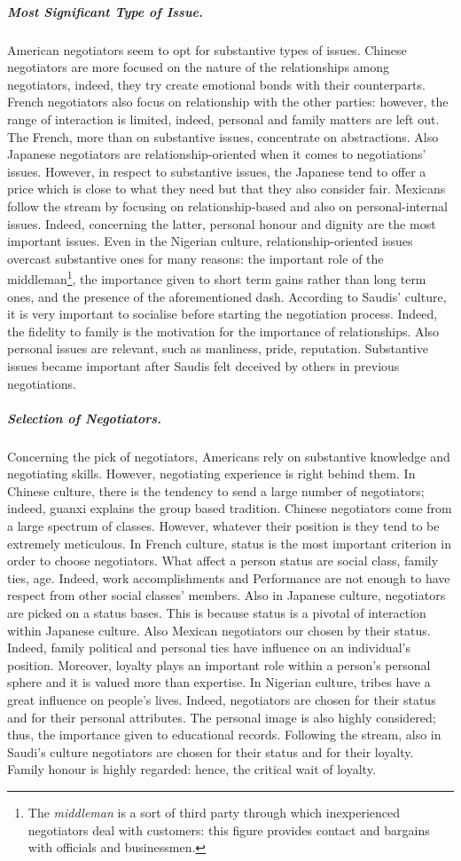 \documentclass[../main.tex]{subfiles}
\begin{document}
\subparagraph{Most Significant Type of Issue.} American negotiators seem to opt for substantive types of issues. Chinese negotiators are more focused on the nature of the relationships among negotiators, indeed, they try create emotional bonds with their counterparts. French negotiators also focus on relationship with the other parties: however, the range of interaction is limited, indeed, personal and family matters are left out. The French, more than on substantive issues, concentrate on abstractions. Also Japanese negotiators are relationship-oriented when it comes to negotiations' issues. However, in respect to substantive issues, the Japanese tend to offer a price which is close to what they need but that they also consider fair. Mexicans follow the stream by focusing on relationship-based and also on personal-internal issues. Indeed, concerning the latter, personal honour and dignity are the most important issues. Even in the Nigerian culture, relationship-oriented issues overcast substantive ones for many reasons: the important role of the middleman\footnote{The \textit{middleman} is a sort of third party through which inexperienced negotiators deal with customers: this figure provides contact and bargains with officials and businessmen.}, the importance given to short term gains rather than long term ones, and the presence of the aforementioned dash. According to Saudis' culture, it is very important to socialise before starting the negotiation process. Indeed, the fidelity to family is the motivation for the importance of relationships. Also personal issues are relevant, such as manliness, pride, reputation. Substantive issues became important after Saudis felt deceived by others in previous negotiations.

\subparagraph{Selection of Negotiators.} Concerning the pick of negotiators,  Americans rely on substantive knowledge and negotiating  skills. However, negotiating experience is right behind them. In Chinese culture, there is the tendency to send a large number of negotiators; indeed, guanxi explains the group based tradition. Chinese negotiators come from a large spectrum of classes. However, whatever their position is they tend to be extremely meticulous.  In French culture,  status is the most important criterion in order to choose negotiators.  What affect a person status are social class, family ties, age. Indeed, work accomplishments and Performance are not enough to have respect from other social classes' members. Also in Japanese culture,  negotiators are picked on a status bases. This is because status is a pivotal of interaction within Japanese culture. Also Mexican negotiators our chosen by their status. Indeed, family political and personal ties have influence on an individual's position. Moreover, loyalty plays an important role within a person's personal sphere and it is valued more than expertise. In Nigerian culture, tribes have a great influence on people's lives. Indeed, negotiators are chosen for their status and for their personal attributes. The personal image is also highly considered; thus, the importance given to educational records. Following the stream, also in Saudi's culture negotiators are chosen for their status and for their loyalty. Family honour is highly regarded: hence, the critical wait of loyalty.
\end{document}
